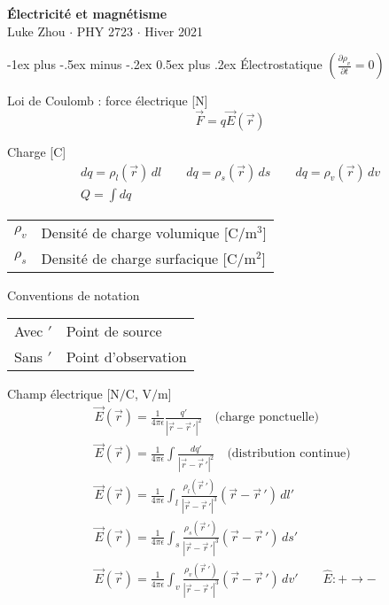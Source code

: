 \documentclass[10pt,landscape]{article}
\makeatletter
\renewcommand{\section}{\@startsection{section}{1}{0mm}%
                                {-1ex plus -.5ex minus -.2ex}%
                                {0.5ex plus .2ex}%
                                {\normalfont\large\bfseries}}
\newcommand{\extraline}{\vspace{1em}}
\newcommand{\halfline}{\vspace{0.5em}}
\newcommand{\tableindent}{\hspace{1.5em}}
\newcommand{\uvec}[1]{\ensuremath{{\hat{#1}}}}
\makeatother
\begin{document}
\raggedright
\footnotesize
\begin{multicols}{3}

\setlength{\premulticols}{1pt}
\setlength{\postmulticols}{1pt}
\setlength{\multicolsep}{1pt}
\setlength{\columnsep}{2pt}

\begin{center}
     \Large{\textbf{Électricité et magnétisme}} \\
     \small{Luke Zhou $\cdot$ PHY 2723 $\cdot$ Hiver 2021}
\end{center}

\section{Électrostatique $\left(\frac{\partial\rho_v}{\partial t} = 0 \right)$}

Loi de Coulomb : force électrique [\si{\newton}]
 \[ \vec{F} = q\vec{E}(\vec{r}) \] %

Charge  [\si{\coulomb}]
\begin{gather*} 
dq = \rho_l(\vec{r}) \,dl  \qquad  dq = \rho_s(\vec{r}) \,ds  \qquad dq = \rho_v(\vec{r}) \,dv  \\
 \textstyle Q = \int dq 
\end{gather*}
\begin{tabular}{@{\tableindent}ll@{}}
	$\rho_v$ & Densité de charge volumique [$\si{\coulomb/\metre^3}$] \\
	$\rho_s$ & Densité de charge surfacique [$\si{\coulomb/\metre^2}$] \\
\end{tabular}

\extraline
Conventions de notation  \\
\halfline
\begin{tabular}{@{\tableindent}ll@{}}
	Avec $'$ & Point de source\\
	Sans $'$ & Point d'observation \\
\end{tabular}

\extraline
Champ électrique [$\si{\newton/\coulomb}$, $\si{\volt/\metre}$]
\begin{align*}
&\vec{E}(\vec{r}) = \frac{1}{4\pi\epsilon} \frac{q'}{| \vec{r} - \vec{r}\,' |^2 }  
\quad \text{(charge ponctuelle)}\\
%
&\vec{E}(\vec{r}) = \frac{1}{4\pi\epsilon} \int \frac{dq'}{| \vec{r} - \vec{r}\,' |^2 } \quad \text{(distribution continue)}\\
%
& \vec{E}(\vec{r}) = \frac{1}{4\pi\epsilon} \int_{l} \frac{\rho_l(\vec{r}\,')}{| \vec{r} - \vec{r}\,' |^3 } (\vec{r} - \vec{r}\,' )\,dl'  \\
%
&\vec{E}(\vec{r}) = \frac{1}{4\pi\epsilon} \int_{s} \frac{\rho_s(\vec{r}\,')}{| \vec{r} - \vec{r}\,'|^3 } (\vec{r} - \vec{r}\,' )\,ds'  \\
%
&\vec{E}(\vec{r}) = \frac{1}{4\pi\epsilon} \int_{v} \frac{\rho_v(\vec{r}\,')}{| \vec{r} - \vec{r}\,' |^3 } (\vec{r} - \vec{r}\,' )\,dv'  \qquad
%
\uvec{E}: + \to - 
\end{align*}
	

\end{multicols}
\end{document}
